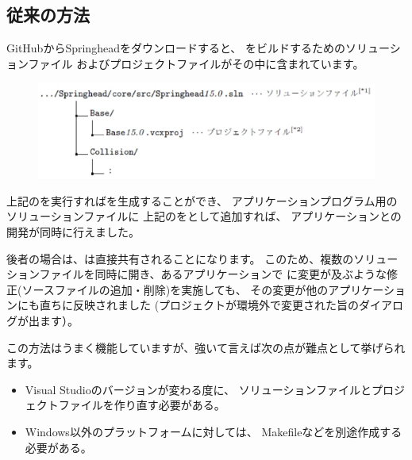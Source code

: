 \subsection{従来の方法}
\label{subsec:ConventionalMethod}

\noindent
GitHubからSpringheadをダウンロードすると、
\SprLib をビルドするためのソリューションファイル
およびプロジェクトファイルがその中に含まれています。

\medskip
\ifLwarp
{}
\begin{narrow}[15pt]
	\begin{figure}[h]
	    \begin{center}
	    \includegraphics[width=.9\textwidth]{fig/DownloadTree.eps}
	    \end{center}
	    \label{fig:DownloadTree}
	\end{figure}
\end{narrow}
\else
\begin{narrow}
    \begin{narrow}[20pt]\begin{minipage}{\textwidth}
	{\footnotesize{}}
	\medskip
  \end{minipage}\end{narrow}
\end{narrow}
\fi

\noindent
上記の\SolutionFile を実行すれば\SprLib を生成することができ、
アプリケーションプログラム用のソリューションファイルに
上記の\ProjectFile をとして追加すれば、
アプリケーションと\SprLib の開発が同時に行えました。

後者の場合は、\ProjectFile は直接共有されることになります。
このため、複数のソリューションファイルを同時に開き、あるアプリケーションで
\ProjectFile に変更が及ぶような修正(ソースファイルの追加・削除)を実施しても、
その変更が他のアプリケーションにも直ちに反映されました
(プロジェクトが環境外で変更された旨のダイアログが出ます）。

\medskip
\noindent
この方法はうまく機能していますが、強いて言えば次の点が難点として挙げられます。

\begin{itemize}
  \item	Visual Studioのバージョンが変わる度に、
	ソリューションファイルとプロジェクトファイルを作り直す必要がある。
  \item	Windows以外のプラットフォームに対しては、
	Makefileなどを別途作成する必要がある。
\end{itemize}

